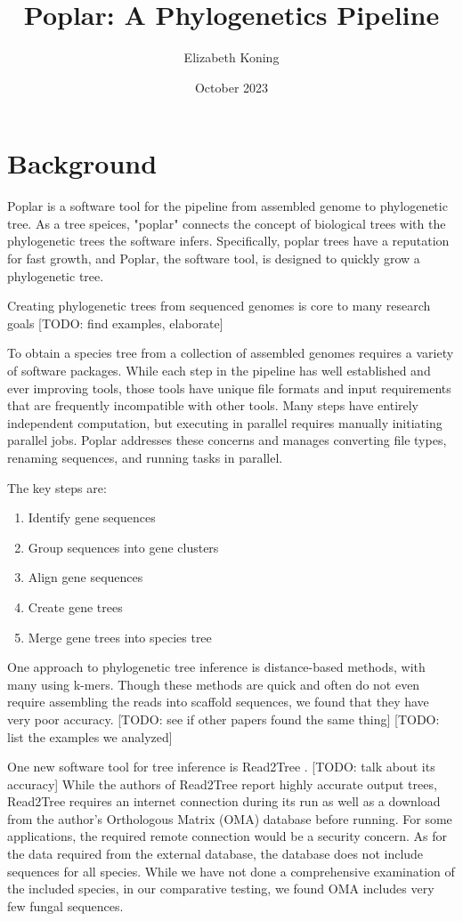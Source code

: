 \documentclass[manuscript,screen,review,nonacm]{acmart}
\title{Poplar: A Phylogenetics Pipeline}
\author{Elizabeth Koning}
\affiliation{
    \institution{Sandia National Labratories}
    \city{Livermore}
    \state{CA}
    \country{USA}
    \postcode{94550}
}
\date{October 2023}
\begin{document}
\maketitle

\section{Background}

Poplar is a software tool for the pipeline from assembled genome to phylogenetic tree. As a tree speices, "poplar" connects the concept of biological trees with the phylogenetic trees the software infers. Specifically, poplar trees have a reputation for fast growth, and Poplar, the software tool, is designed to quickly grow a phylogenetic tree.

Creating phylogenetic trees from sequenced genomes is core to many research goals [TODO: find examples, elaborate]

To obtain a species tree from a collection of assembled genomes requires a variety of software packages. While each step in the pipeline has well established and ever improving tools, those tools have unique file formats and input requirements that are frequently incompatible with other tools. Many steps have entirely independent computation, but executing in parallel requires manually initiating parallel jobs. Poplar addresses these concerns and manages converting file types, renaming sequences, and running tasks in parallel.

The key steps are:

\begin{enumerate}
    \item Identify gene sequences
    \item Group sequences into gene clusters
    \item Align gene sequences
    \item Create gene trees
    \item Merge gene trees into species tree
\end{enumerate}

One approach to phylogenetic tree inference is distance-based methods, with many using k-mers. Though these methods are quick and often do not even require assembling the reads into scaffold sequences, we found that they have very poor accuracy. [TODO: see if other papers found the same thing] [TODO: list the examples we analyzed]

One new software tool for tree inference is Read2Tree \cite{read2tree}. [TODO: talk about its accuracy] While the authors of Read2Tree report highly accurate output trees, Read2Tree requires an internet connection during its run as well as a download from the author's Orthologous Matrix (OMA) database before running. For some applications, the required remote connection would be a security concern. As for the data required from the external database, the database does not include sequences for all species. While we have not done a comprehensive examination of the included species, in our comparative testing, we found OMA includes very few fungal sequences.
\end{document}
